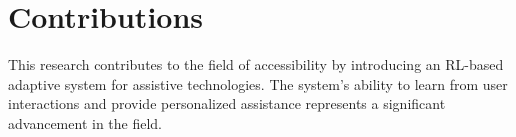 \documentclass{article}
\begin{document}
\section{Contributions}
This research contributes to the field of accessibility by introducing an RL-based adaptive system for assistive technologies. The system's ability to learn from user interactions and provide personalized assistance represents a significant advancement in the field.



\end{document}
